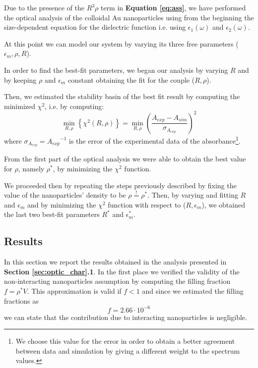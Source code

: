 \documentclass[twocolumn]{article}
\begin{document}
\begin{multicols}{2}

Due to the presence of the $R^3\rho$ term in \textbf{Equation \ref{eq:ass}}, we have performed the optical analysis of the colloidal Au nanoparticles using from the beginning the size-dependent equation for the dielectric function i.e. using $\epsilon_1(\omega)$ and $\epsilon_2(\omega)$.

At this point we can model our system by varying its three free parameters ($\epsilon_m, \rho, R$). 

In order to find the best-fit parameters, we began our analysis by varying $R$ and by keeping $\rho$ and $\epsilon_m$ constant obtaining the fit for the couple ($R,\rho$). 

Then, we estimated the stability basin of the best fit result by computing the minimized $\chi^2$, i.e. by computing:
\begin{equation}
        {\min}_{R,\rho} \left\{\chi^2 (R,\rho) \right\} =\min_{R,\rho} \left(\frac{A_{exp}-A_{sim}}{\sigma_{A_{exp}}}\right)^2 
\end{equation}
where $\sigma_{A_{exp}}={A_{exp}}^{-1}$ is the error of the experimental data of the absorbance\footnote{We choose this value for the error in order to obtain a better agreement between data and simulation by giving a different weight to the spectrum values.}. 

From the first part of the optical analysis we were able to obtain the best value for $\rho$, namely $\rho^*$, by minimizing the $\chi^2$ function.

We proceeded then by repeating the steps previously described by fixing the value of the nanoparticles' density to be $\rho\overset{!}{=}\rho^*$. Then, by varying and fitting $R$ and $\epsilon_m$ and by minimizing the $\chi^2$ function with respect to ($R,\epsilon_m$), we obtained the last two best-fit parameters $R^*$ and $\epsilon_m^*$.

\subsection{Results}

In this section we report the results obtained in the analysis presented in \textbf{Section \ref{sec:optic_char}.1}.
In the first place we verified the validity of the non-interacting nanoparticles assumption by computing the filling fraction $f=\rho^* V$. This approximation is valid if $f<1$ and since we estimated the filling fractions as
\[f=2.66\cdot 10^{-6}\]
we can state that the contribution due to interacting nanoparticles is negligible.


\end{multicols}
\end{document}
